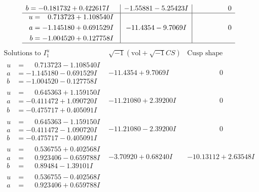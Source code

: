 \documentclass[1p]{elsarticle_modified}
\theoremstyle{definition}
\newcommand{\I}{\sqrt{-1}}
\begin{document}
$$\begin{array}{c|c|c}
\begin{aligned}
b &= -0.181732 + 0.422617 I\end{aligned}
 & -1.55881 - 5.25423 I & \phantom{-0.000000 } 0 \\ \hline\begin{aligned}
u &= \phantom{-}0.713723 + 1.108540 I \\
a &= -1.145180 + 0.691529 I \\
b &= -1.004520 + 0.127758 I\end{aligned}
 & -11.4354 - 9.7069 I & \phantom{-0.000000 } 0\\
 \hline 
 \end{array}$$\newpage$$\begin{array}{c|c|c}  
\text{Solutions to }I^u_{1}& \I (\text{vol} + \sqrt{-1}CS) & \text{Cusp shape}\\
 \hline 
\begin{aligned}
u &= \phantom{-}0.713723 - 1.108540 I \\
a &= -1.145180 - 0.691529 I \\
b &= -1.004520 - 0.127758 I\end{aligned}
 & -11.4354 + 9.7069 I & \phantom{-0.000000 } 0 \\ \hline\begin{aligned}
u &= \phantom{-}0.645363 + 1.159150 I \\
a &= -0.411472 + 1.090720 I \\
b &= -0.475717 + 0.405091 I\end{aligned}
 & -11.21080 + 2.39200 I & \phantom{-0.000000 } 0 \\ \hline\begin{aligned}
u &= \phantom{-}0.645363 - 1.159150 I \\
a &= -0.411472 - 1.090720 I \\
b &= -0.475717 - 0.405091 I\end{aligned}
 & -11.21080 - 2.39200 I & \phantom{-0.000000 } 0 \\ \hline\begin{aligned}
u &= \phantom{-}0.536755 + 0.402568 I \\
a &= \phantom{-}0.923406 - 0.659788 I \\
b &= \phantom{-}0.89484 - 1.39101 I\end{aligned}
 & -3.70920 + 0.68240 I & -10.13112 + 2.63548 I \\ \hline\begin{aligned}
u &= \phantom{-}0.536755 - 0.402568 I \\
a &= \phantom{-}0.923406 + 0.659788 I \\

\end{aligned}
\end{array}$$
\end{document}

